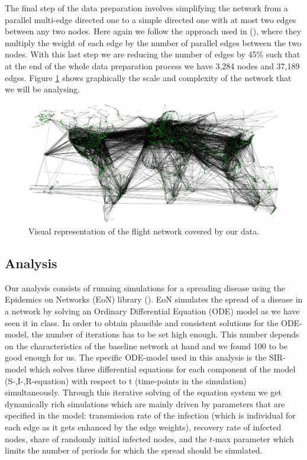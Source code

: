 \documentclass{Template_resources/netsci-project}
\begin{document}
The final step of the data preparation involves simplifying the network from a parallel multi-edge directed one to a simple directed one with at most two edges between any two nodes. Here again we follow the approach used in \citeauthor{Lawyer2016} (\citeyear{Lawyer2016}), where they multiply the weight of each edge by the number of parallel edges between the two nodes. With this last step we are reducing the number of edges by 45\% such that at the end of the whole data preparation process we have 3,284 nodes and 37,189 edges. Figure \ref{fig:final_network} shows graphically the scale and complexity of the network that we will be analysing.
\begin{figure}[!h]
    \centering
    \includegraphics[width=\linewidth]{Figures/final_network.pdf}
    \caption{Visual representation of the flight network covered by our data.}
    \label{fig:final_network}
\end{figure}


\subsection{Analysis}
Our analysis consists of running simulations for a spreading disease using the Epidemics on Networks (EoN) library (\cite{eon}). EoN simulates the spread of a disease in a network by solving an Ordinary Differential Equation (ODE) model as we have seen it in class. In order to obtain plausible and consistent solutions for the ODE-model, the number of iterations has to be set high enough. This number depends on the characteristics of the baseline network at hand and we found 100 to be good enough for us. The specific ODE-model used in this analysis is the SIR-model which solves three differential equations for each component of the model (S-,I-,R-equation) with respect to t (time-points in the simulation) simultaneously. Through this iterative solving of the equation system we get dynamically rich simulations which are mainly driven by parameters that are specified in the model: transmission rate of the infection (which is individual for each edge as it gets enhanced by the edge weights), recovery rate of infected nodes, share of randomly initial infected nodes, and the $t$-max parameter which limits the number of periods for which the spread should be simulated.
\end{document}
